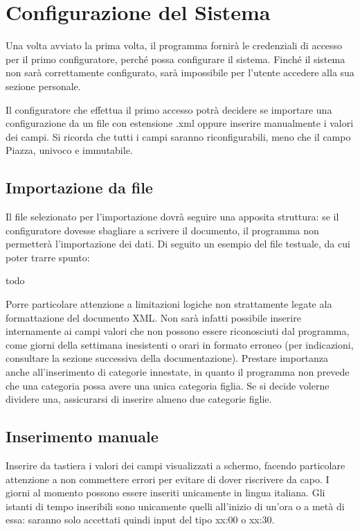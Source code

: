 
\section{Configurazione del Sistema}
Una volta avviato la prima volta, il programma fornirà le credenziali di accesso per il primo configuratore, perché possa configurare il sistema.
Finché il sistema non sarà correttamente configurato, sarà impossibile per l'utente accedere alla sua sezione personale.

Il configuratore che effettua il primo accesso potrà decidere se importare una configurazione da un file con estensione .xml oppure inserire manualmente i valori dei campi.
Si ricorda che tutti i campi saranno riconfigurabili, meno che il campo Piazza, univoco e immutabile.

\subsection{Importazione da file}
Il file selezionato per l'importazione dovrà seguire una apposita struttura: se il configuratore dovesse sbagliare a scrivere il documento, il programma non permetterà l'importazione dei dati.
Di seguito un esempio del file testuale, da cui poter trarre spunto:

todo

Porre particolare attenzione a limitazioni logiche non strattamente legate ala formattazione del documento XML.
Non sarà infatti possibile inserire internamente ai campi valori che non possono essere riconosciuti dal programma, come giorni della settimana inesistenti o orari in formato erroneo (per indicazioni, consultare la sezione successiva della documentazione).
Prestare importanza anche all'inserimento di categorie innestate, in quanto il programma non prevede che una categoria possa avere una unica categoria figlia. Se si decide volerne dividere una, assicurarsi di inserire almeno due categorie figlie.

\subsection{Inserimento manuale}
Inserire da tastiera i valori dei campi visualizzati a schermo, facendo particolare attenzione a non commettere errori per evitare di dover riscrivere da capo.
I giorni al momento possono essere inseriti unicamente in lingua italiana.
Gli istanti di tempo inseribili sono unicamente quelli all'inizio di un'ora o a metà di essa: saranno solo accettati quindi input del tipo xx:00 o xx:30.

